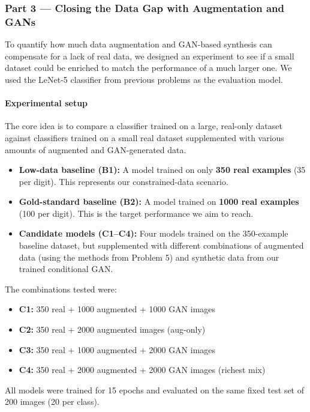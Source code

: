 \subsubsection{Part 3 — Closing the Data Gap with Augmentation and GANs}
To quantify how much data augmentation and GAN-based synthesis can compensate for a lack of real data, we designed an experiment to see if a small dataset could be enriched to match the performance of a much larger one. We used the LeNet-5 classifier from previous problems as the evaluation model.

\paragraph{Experimental setup}
The core idea is to compare a classifier trained on a large, real-only dataset against classifiers trained on a small real dataset supplemented with various amounts of augmented and GAN-generated data.

\begin{itemize}
	\item \textbf{Low-data baseline (B1):} A model trained on only \textbf{350 real examples} (35 per digit). This represents our constrained-data scenario.
	\item \textbf{Gold-standard baseline (B2):} A model trained on \textbf{1000 real examples} (100 per digit). This is the target performance we aim to reach.
	\item \textbf{Candidate models (C1--C4):} Four models trained on the 350-example baseline dataset, but supplemented with different combinations of augmented data (using the methods from Problem 5) and synthetic data from our trained conditional GAN.
\end{itemize}

The combinations tested were:
\begin{itemize}
	\item \textbf{C1:} 350 real + 1000 augmented + 1000 GAN images
	\item \textbf{C2:} 350 real + 2000 augmented images (aug-only)
	\item \textbf{C3:} 350 real + 1000 augmented + 2000 GAN images
	\item \textbf{C4:} 350 real + 2000 augmented + 2000 GAN images (richest mix)
\end{itemize}

All models were trained for 15 epochs and evaluated on the same fixed test set of 200 images (20 per class).

